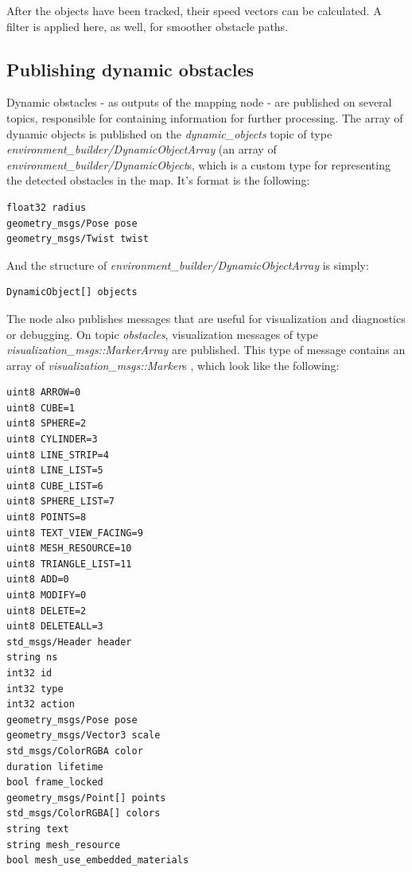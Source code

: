 After the objects have been tracked, their speed vectors can be calculated. A filter is applied here, as well, for smoother obstacle paths.

\subsection{Publishing dynamic obstacles}
\label{chap:publishing_dynamic_obstacles}
Dynamic obstacles - as outputs of the mapping node - are published on several topics, responsible for containing information for further processing. The array of dynamic objects is published on the \textit{dynamic\_objects} topic of type \textit{environment\_builder/DynamicObjectArray} (an array of \textit{environment\_builder/DynamicObject}s, which is a custom type for representing the detected obstacles in the map. It's format is the following:

\begin{minipage}{\textwidth}
\begin{lstlisting}[language=IDL]
float32 radius
geometry_msgs/Pose pose
geometry_msgs/Twist twist
\end{lstlisting}
\end{minipage}

And the structure of \textit{environment\_builder/DynamicObjectArray} is simply:

\begin{lstlisting}[language=IDL]
DynamicObject[] objects
\end{lstlisting}

The node also publishes messages that are useful for visualization and diagnostics or debugging. On topic \textit{obstacles}, visualization messages of type \textit{visualization\_msgs::MarkerArray} \cite{ros_msg_MarkerArray} are published. This type of message contains an array of \textit{visualization\_msgs::Marker}s \cite{ros_msg_Marker}, which look like the following:

\begin{minipage}{\textwidth}
\begin{lstlisting}[language=IDL]
uint8 ARROW=0
uint8 CUBE=1
uint8 SPHERE=2
uint8 CYLINDER=3
uint8 LINE_STRIP=4
uint8 LINE_LIST=5
uint8 CUBE_LIST=6
uint8 SPHERE_LIST=7
uint8 POINTS=8
uint8 TEXT_VIEW_FACING=9
uint8 MESH_RESOURCE=10
uint8 TRIANGLE_LIST=11
uint8 ADD=0
uint8 MODIFY=0
uint8 DELETE=2
uint8 DELETEALL=3
std_msgs/Header header
string ns
int32 id
int32 type
int32 action
geometry_msgs/Pose pose
geometry_msgs/Vector3 scale
std_msgs/ColorRGBA color
duration lifetime
bool frame_locked
geometry_msgs/Point[] points
std_msgs/ColorRGBA[] colors
string text
string mesh_resource
bool mesh_use_embedded_materials
\end{lstlisting}
\end{minipage}

